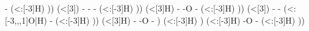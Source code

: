 \begin{struct}
{                                                                            -
                                                                              (<:[-3]H)
                                                                          ))
                                                                            (<[3])
                                                                          -
                                                                          -
                                                                          -
                                                                            (<:[-3]H)
                                                                        ))
                                                                          (<[3]H)
                                                                        -
                                                                        -\textcolor{O}{O}
                                                                        -
                                                                          (<:[-3]H)
                                                                      ))
                                                                        (<[3])
                                                                      -
                                                                      -
                                                                        (<:[-3,,,1]\textcolor{O}{O}|\textcolor{O}{H})
                                                                      -
                                                                        (<:[-3]H)
                                                                    ))
                                                                      (<[3]H)
                                                                    -
                                                                    -\textcolor{O}{O}
                                                                    -
                                                                  )
                                                                    (<:[-3]H)
                                                                )
                                                                  (<:[-3]H)
                                                                -\textcolor{O}{O}
                                                                -
                                                                  (<:[-3]H)
                                                              ))
}
\end{struct}
